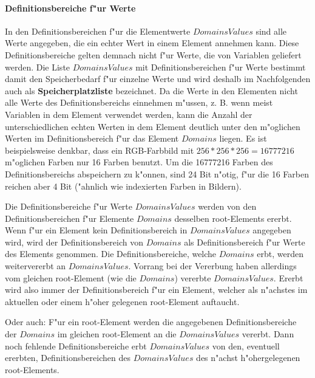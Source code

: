 \paragraph{Definitionsbereiche f"ur Werte}
\label{secDomainsForValues}

In den Definitionsbereichen f"ur die Elementwerte $DomainsValues$ sind alle Werte angegeben, die ein echter Wert in einem Element annehmen kann. Diese Definitionsbereiche gelten demnach nicht f"ur Werte, die von Variablen geliefert werden. Die Liste $DomainsValues$ mit Definitionsbereichen f"ur Werte bestimmt damit den Speicherbedarf f"ur einzelne Werte und wird deshalb im Nachfolgenden auch als \textbf{Speicherplatzliste} bezeichnet. Da die Werte in den Elementen nicht alle Werte des Definitionsbereichs einnehmen m"ussen, z. B. wenn meist Variablen in dem Element verwendet werden, kann die Anzahl der unterschiedlichen echten Werten in dem Element deutlich unter den m"oglichen Werten im Definitionsbereich f"ur das Element $Domains$ liegen. Es ist beispielsweise denkbar, dass ein RGB-Farbbild mit $256*256*256=16777216$ m"oglichen Farben nur 16 Farben benutzt. Um die 16777216 Farben des Definitionsbereichs abspeichern zu k"onnen, sind 24 Bit n"otig, f"ur die 16 Farben reichen aber 4 Bit ("ahnlich wie indexierten Farben in Bildern).

Die Definitionsbereiche f"ur Werte $DomainsValues$ werden von den Definitionsbereichen f"ur Elemente $Domains$ desselben root-Elements ererbt. Wenn f"ur ein Element kein Definitionsbereich in $DomainsValues$ angegeben wird, wird der Definitionsbereich von $Domains$ als Definitionsbereich f"ur Werte des Elements genommen. Die Definitionsbereiche, welche $Domains$ erbt, werden weitervererbt an $DomainsValues$. Vorrang bei der Vererbung haben allerdings vom gleichen root-Element (wie die $Domains$) vererbte $DomainsValues$. Ererbt wird also immer der Definitionsbereich f"ur ein Element, welcher als n"achstes im aktuellen oder einem h"oher gelegenen root-Element auftaucht.

Oder auch: F"ur ein root-Element werden die angegebenen Definitionsbereiche der $Domains$ im gleichen root-Element an die $DomainsValues$ vererbt. Dann noch fehlende Definitionsbereiche erbt $DomainsValues$ von den, eventuell ererbten, Definitionsbereichen des $DomainsValues$ des n"achst h"ohergelegenen root-Elements.

